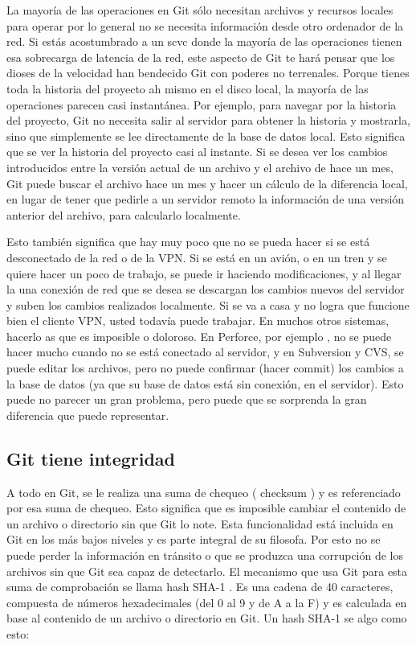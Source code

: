 \documentclass[12pt, spanish, oneside, onecolumn, a4paper]{report}
\begin{document}
La mayoría de las operaciones en Git sólo necesitan archivos y recursos locales para operar por lo general no se necesita información desde otro ordenador de la red. Si estás acostumbrado a un \gls{scvc} donde la mayoría de las operaciones tienen esa sobrecarga de latencia de la red, este aspecto de Git te hará pensar que los dioses de la velocidad han bendecido Git con poderes no terrenales. Porque tienes toda la historia del proyecto ah mismo en el disco local, la mayoría de las operaciones parecen casi instantánea.
Por ejemplo, para navegar por la historia del proyecto, Git no necesita salir al servidor para obtener la historia y mostrarla, sino que simplemente se lee directamente de la base de datos local. Esto significa que se ver la historia del proyecto casi al instante. Si se desea ver los cambios introducidos entre la versión actual de un archivo y el archivo de hace un mes, Git puede buscar el archivo hace un mes y hacer un cálculo de la diferencia local, en lugar de tener que pedirle a un servidor remoto la información de una versión anterior del archivo, para calcularlo localmente.

Esto también significa que hay muy poco que no se pueda hacer si se está desconectado de la red o de la VPN. Si se está en un avión, o en un tren y se quiere hacer un poco de trabajo, se puede ir haciendo modificaciones, y al llegar la una conexión de red que se desea se descargan los cambios nuevos del servidor y suben los cambios realizados localmente. Si se va a casa y no logra que funcione bien el cliente VPN, usted todavía puede trabajar. En muchos otros sistemas, hacerlo as que es imposible o doloroso. En Perforce, por ejemplo , no se puede hacer mucho cuando no se está conectado al servidor, y en Subversion y CVS, se puede editar los archivos, pero no puede confirmar (hacer commit) los cambios a la base de datos (ya que su base de datos está sin conexión, en el servidor). Esto puede no parecer un gran problema, pero puede que se sorprenda la gran diferencia que puede representar.

\subsection{Git tiene integridad}
\label{sec:integrity}


A todo en Git, se le realiza una suma de chequeo ( checksum ) y es referenciado por esa suma de chequeo. Esto significa que es imposible cambiar el contenido de un archivo o directorio sin que Git lo note. Esta funcionalidad está incluida en Git en los más bajos niveles y es parte integral de su filosofa. Por esto no se puede perder la información en tránsito o que se produzca una corrupción de los archivos sin que Git sea capaz de detectarlo.
El mecanismo que usa Git para esta suma de comprobación se llama hash SHA-1 . Es una cadena de 40 caracteres, compuesta de números hexadecimales (del 0 al 9 y de A a la F) y es calculada en base al contenido de un archivo o directorio en Git. Un  hash SHA-1 se algo como esto:
\end{document}
